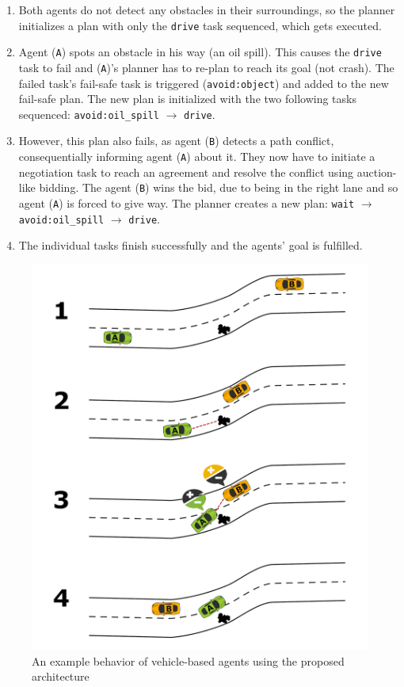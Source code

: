 \documentclass[main.tex]{subfiles}
\begin{document}
\begin{enumerate}
    \item Both agents do not detect any obstacles in their surroundings, so the planner
    initializes a plan with only the \texttt{drive} task sequenced, which gets executed. 

    \item Agent (\texttt{A}) spots an obstacle in his way (an oil spill). This causes the
    \texttt{drive} task to fail and (\texttt{A})'s planner has to re-plan to reach its goal (not
    crash). The failed task's fail-safe task is triggered (\texttt{avoid:object})
    and added to the new fail-safe plan. The new plan is initialized with the two
    following tasks sequenced: \texttt{avoid:oil\_spill} $\rightarrow$ \texttt{drive}.
    
    \item However, this plan also fails, as agent (\texttt{B}) detects a path conflict, consequentially 
    informing agent (\texttt{A}) about it. They now have to initiate a negotiation task to reach an agreement and
    resolve the conflict using auction-like bidding. The agent (\texttt{B}) wins the bid, due
    to being in the right lane and so agent (\texttt{A}) is forced to give way. The planner
    creates a new plan: \texttt{wait} $\rightarrow$ \texttt{avoid:oil\_spill} $\rightarrow$
    \texttt{drive}.
    
    \item The individual tasks finish successfully and the agents' goal is fulfilled.
\end{enumerate}

\begin{figure}[htbp]
    \centering
    \includegraphics[width=.8\textwidth]{AgentPlanning.png}
    \caption{An example behavior of vehicle-based agents using the proposed architecture}
    \label{agentReplanning}
\end{figure}
\end{document}
